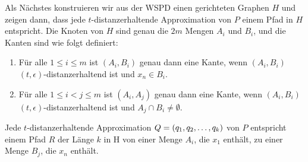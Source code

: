     Als Nächstes konstruieren wir aus der WSPD einen gerichteten Graphen $H$ und zeigen dann, dass jede $t$-distanzerhaltende Approximation von $P$ einem Pfad in $H$ entspricht.
    Die Knoten von $H$ sind genau die $2m$ Mengen $A_i$ und $B_i$, und die Kanten sind wie folgt definiert:
    \begin{enumerate}
    	\item Für alle $1 \leq i \leq m$ ist $(A_i, B_i)$ genau dann eine Kante, wenn $(A_i, B_i)$ $(t, \epsilon)$-distanzerhaltend ist und $x_n \in B_i$.
    	\item Für alle $1\leq i < j \leq m$ ist $(A_i, A_j)$ genau dann eine Kante, wenn $(A_i, B_i)$ $(t, \epsilon)$-distanzerhaltend ist und $A_j \cap B_i \neq \emptyset$.
    \end{enumerate}

	\begin{theorem}
		\label{theo:Approx2H}
		Jede $t$-distanzerhaltende Approximation $Q = (q_1, q_2, \mathellipsis, q_k)$ von $P$ entspricht einem Pfad $R$ der Länge $k$ in H von einer Menge $A_i$, die $x_1$ enthält, zu einer Menge $B_j$, die $x_n$ enthält.
	\end{theorem}
